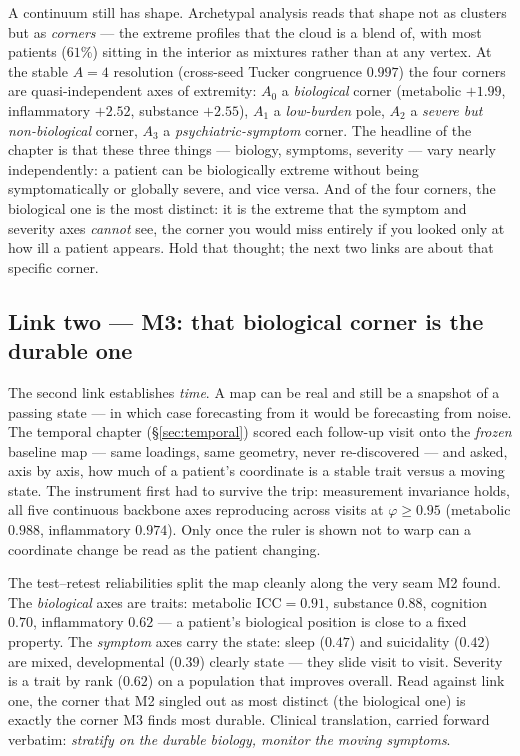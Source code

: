 A continuum still has shape. Archetypal analysis reads that shape not as clusters but as \emph{corners} ---
the extreme profiles that the cloud is a blend of, with most patients ($61\%$) sitting in the interior as
mixtures rather than at any vertex. At the stable $A=4$ resolution (cross-seed Tucker congruence $0.997$) the
four corners are quasi-independent axes of extremity: $A_0$ a \emph{biological} corner (metabolic $+1.99$,
inflammatory $+2.52$, substance $+2.55$), $A_1$ a \emph{low-burden} pole, $A_2$ a \emph{severe but
non-biological} corner, $A_3$ a \emph{psychiatric-symptom} corner. The headline of the chapter is that
these three things --- biology, symptoms, severity --- vary nearly independently: a patient can be
biologically extreme without being symptomatically or globally severe, and vice versa. And of the four
corners, the biological one is the most distinct: it is the extreme that the symptom and severity axes
\emph{cannot} see, the corner you would miss entirely if you looked only at how ill a patient appears. Hold
that thought; the next two links are about that specific corner.

\subsection{Link two --- M3: that biological corner is the durable one}
The second link establishes \emph{time}. A map can be real and still be a snapshot of a passing state ---
in which case forecasting from it would be forecasting from noise. The temporal chapter (\S\ref{sec:temporal})
scored each follow-up visit onto the \emph{frozen} baseline map --- same loadings, same geometry, never
re-discovered --- and asked, axis by axis, how much of a patient's coordinate is a stable trait versus a
moving state. The instrument first had to survive the trip: measurement invariance holds, all five
continuous backbone axes reproducing across visits at $\varphi\geq0.95$ (metabolic $0.988$, inflammatory
$0.974$). Only once the ruler is shown not to warp can a coordinate change be read as the patient changing.

\begin{keyresult}
The test--retest reliabilities split the map cleanly along the very seam M2 found. The \emph{biological}
axes are traits: metabolic $\text{ICC}=0.91$, substance $0.88$, cognition $0.70$, inflammatory $0.62$ ---
a patient's biological position is close to a fixed property. The \emph{symptom} axes carry the state: sleep
($0.47$) and suicidality ($0.42$) are mixed, developmental ($0.39$) clearly state --- they slide visit to
visit. Severity is a trait by
rank ($0.62$) on a population that improves overall. Read against link one, the corner that M2 singled out
as most distinct (the biological one) is exactly the corner M3 finds most durable. Clinical translation,
carried forward verbatim: \emph{stratify on the durable biology, monitor the moving symptoms}.
\end{keyresult}

